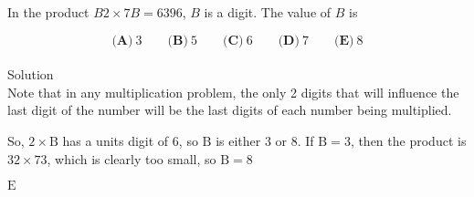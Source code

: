 

In the product $ B2 \times 7B=6396$, $ B$ is a digit. The value of $ B$ is

\[ \textbf{(A)}\ 3 \qquad
\textbf{(B)}\ 5 \qquad
\textbf{(C)}\ 6 \qquad
\textbf{(D)}\ 7 \qquad
\textbf{(E)}\ 8
\]
\\
Solution
\\
Note that in any multiplication problem, the only 2 digits that will influence the last digit of the number will be the last digits of each number being multiplied.

So, $2 \times \text{B}$ has a units digit of $6$, so $\text{B}$ is either $3$ or $8$. If $\text{B}=3$, then the product is $32\times 73$, which is clearly too small, so $\text{B}=8$

$\boxed{\text{E}}$
